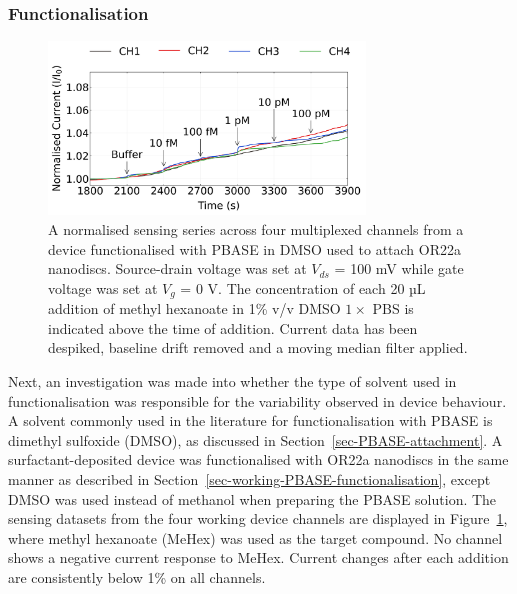 \documentclass[
  a4paper,
]{scrbook}
\begin{document}
\hypertarget{functionalisation}{%
\subsubsection*{Functionalisation}\label{functionalisation}}

\begin{figure}

{\centering \includegraphics[width=0.75\textwidth,height=\textheight]{figures/ch7/NTQ25C10_OR22a_sample_220208_filtered_detrend_trunc_arrows_normalised.png}

}

\caption[A normalised and filtered sensing series across four
multiplexed channels from a device functionalised with PBASE in DMSO
used to attach OR22a nanodiscs.]{\label{fig-DMSO-sensing}A normalised
sensing series across four multiplexed channels from a device
functionalised with PBASE in DMSO used to attach OR22a nanodiscs.
Source-drain voltage was set at \(V_{ds}\) = 100 mV while gate voltage
was set at \(V_g\) = 0 V. The concentration of each 20 µL addition of
methyl hexanoate in 1\% v/v DMSO \(1 \times\) PBS is indicated above the
time of addition. Current data has been despiked, baseline drift removed
and a moving median filter applied.}

\end{figure}

Next, an investigation was made into whether the type of solvent used in
functionalisation was responsible for the variability observed in device
behaviour. A solvent commonly used in the literature for
functionalisation with PBASE is dimethyl sulfoxide (DMSO), as discussed
in Section~\ref{sec-PBASE-attachment}. A surfactant-deposited device was
functionalised with OR22a nanodiscs in the same manner as described in
Section~\ref{sec-working-PBASE-functionalisation}, except DMSO was used
instead of methanol when preparing the PBASE solution. The sensing
datasets from the four working device channels are displayed in
Figure~\ref{fig-DMSO-sensing}, where methyl hexanoate (MeHex) was used
as the target compound. No channel shows a negative current response to
MeHex. Current changes after each addition are consistently below 1\% on
all channels.
\end{document}

